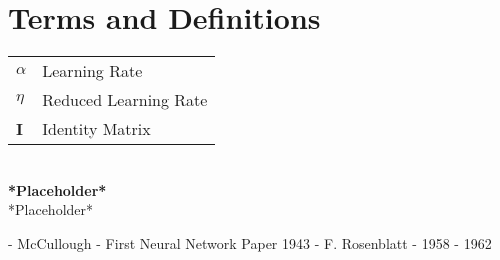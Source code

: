 \documentclass[a4paper,12pt,hidelinks]{report}
\begin{document}
\chapter*{Terms and Definitions}
\begin{tabular}{l | l}
\(\alpha\) & Learning Rate \\
\(\eta\) & Reduced Learning Rate \\
\textbf{I} & Identity Matrix \\
\end{tabular}\\
\noindent \textbf{*Placeholder*} \\ 
*Placeholder*
\newpage
%

%

%
%
%

\vspace*{50mm}
- McCullough - First Neural Network Paper 1943
- F. Rosenblatt - 1958 - 1962
%
\end{document}

